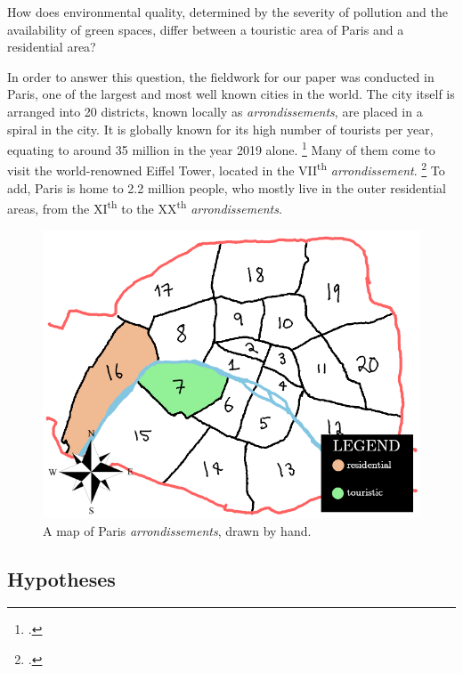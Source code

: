 \documentclass[11pt,letterpaper]{article}
\begin{document}
How does environmental quality, determined by the severity of pollution and the availability of green spaces, differ between a touristic area of Paris and a residential area?

In order to answer this question, the fieldwork for our paper was conducted in Paris, one of the largest and most well known cities in the world. The city itself is arranged into 20 districts, known locally as \textit{arrondissements}, are placed in a spiral in the city. It is globally known for its high number of tourists per year, equating to around 35 million in the year 2019 alone. \footcite{statista_department_27_2020} Many of them come to visit the world-renowned Eiffel Tower, located in the VII\textsuperscript{th} \textit{arrondissement}. \footcite{condor_ferries} To add, Paris is home to 2.2 million people, who mostly live in the outer residential areas, from the XI\textsuperscript{th} to the XX\textsuperscript{th} \textit{arrondissements}.

\begin{figure}[h!]
    \centering
    \includegraphics[width=0.7\linewidth]{media/arrts.png}
    \caption{A map of Paris \textit{arrondissements}, drawn by hand.}
\end{figure}



\subsection{Hypotheses}
\end{document}
